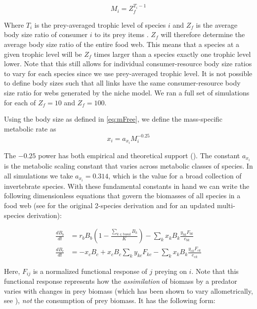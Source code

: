 \documentclass[/home/nkappler/Research/Dissertation/dissertation.tex]{subfiles}
\begin{document}
\begin{bibunit}
\begin{equation}
    M_i= Z_{\!f}^{T_i-1}\label{eq:mFree}
\end{equation}

Where $T_i$ is the prey-averaged trophic level of species $i$ and $Z_{\!f}$ is
the average body size ratio of consumer $i$ to its prey items
\cite{Williams2004}. $Z_{\!f}$ will therefore determine the average body size
ratio of the entire food web. This means that a species at a given trophic
level will be $Z_{\!f}$ times larger than a species exactly one trophic level
lower. Note that this still allows for individual consumer-resource body size
ratios to vary for each species since we use prey-averaged trophic level. It is
not possible to define body sizes such that all links have the same
consumer-resource body size ratio for webs generated by the niche model. We ran
a full set of simulations for each of $Z_{\!f} = 10$ and $Z_{\!f} = 100$. 

Using the body size as defined in \eqref{eq:mFree}, we define the mass-specific metabolic rate as
\begin{equation}
x_i = a_{x_i} M_i^{-0.25}\label{eq:x}
\end{equation}

The $-0.25$ power has both empirical and theoretical support
(\cite{Brown2004, West1997}). The constant $a_{x_i}$ is the metabolic scaling
constant that varies across metabolic classes of species. In all simulations we
take $a_{x_i}=0.314$, which is the value for a broad collection of invertebrate
species. With these fundamental constants in hand we can write the following
dimensionless equations that govern the biomasses of all species in a food web
(see \cite{Yodzis1992} for the original 2-species derivation and
\cite{Williams2007} for an updated multi-species derivation): 

\begin{subequations}\label{eq:atn0}
\begin{align}
\frac{dB_{b}}{dt} &= r_bB_b\left(1-\frac{\sum_{k\in\text{basal}}B_k}{K}\right) - \sum_kx_kB_k\frac{y_{bk}F_{bk}}{e_{bk}}\label{subeq:basal0} \\ 
\frac{dB_{c}}{dt} &= -x_cB_c + x_cB_c\sum_ky_{kc}F_{kc} - \sum_k x_kB_k\frac{y_{ck}F_{ck}}{e_{ck}} \label{subeq:con0}
\end{align}
\end{subequations}

Here, $F_{ij}$ is a normalized functional response of $j$ preying on $i$. Note
that this functional response represents how the \textit{assimilation} of
biomass by a predator varies with changes in prey biomass (which has been shown
to vary allometrically, see \cite{Brown2004}), \textit{not} the consumption of
prey biomass. It has the following form:


\end{bibunit}
\end{document}
